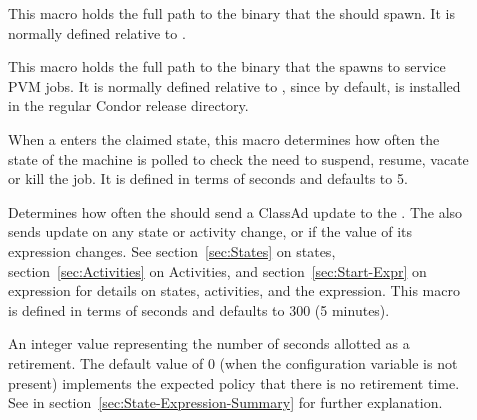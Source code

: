 \begin{description}

\item[] \label{param:Starter}  This macro holds the
  full path to the  binary that the  should 
  spawn.
  It is normally defined relative to .
  
\item[] \label{param:AlternateStarter1}
  This macro holds the full path to the 
  binary that the  spawns to service PVM jobs.  It is normally
  defined relative to , since by default,
   is installed in the regular Condor release
  directory. 
  
\item[] \label{param:PollingInterval} When a
   enters the claimed state, this macro determines how often
  the state of the machine is polled to check the need to suspend, resume,
  vacate or kill the job.  It is defined in terms of seconds and defaults to
  5.
  
\item[] \label{param:UpdateInterval}
  Determines how often the  should send a ClassAd update
  to the .  The  also sends update on any
  state or activity change, or if the value of its  expression
  changes.  See section~\ref{sec:States} on 
  states, section~\ref{sec:Activities} on 
  Activities, and section~\ref{sec:Start-Expr} on 
   expression for details on states, activities, and the
   expression.  This macro is defined in
  terms of seconds and defaults to 300 (5 minutes).
  
\item[] \label{param:MaxJobRetirementTime}
  An integer value representing the number of seconds allotted as
  a retirement. The default value of 0 (when the configuration
  variable is not present) implements the expected policy that
  there is no retirement time.
  See  in
  section~\ref{sec:State-Expression-Summary} for further explanation.



\end{description}
